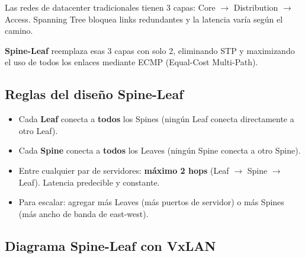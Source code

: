 \begin{concepto}
Las redes de datacenter tradicionales tienen 3 capas: Core $\to$ Distribution $\to$ Access.
Spanning Tree bloquea links redundantes y la latencia varía según el camino.

\textbf{Spine-Leaf} reemplaza esas 3 capas con solo 2, eliminando STP y maximizando
el uso de todos los enlaces mediante ECMP (Equal-Cost Multi-Path).
\end{concepto}

\subsection{Reglas del diseño Spine-Leaf}

\begin{itemize}
    \item Cada \textbf{Leaf} conecta a \textbf{todos} los Spines (ningún Leaf conecta
          directamente a otro Leaf).
    \item Cada \textbf{Spine} conecta a \textbf{todos} los Leaves (ningún Spine conecta
          a otro Spine).
    \item Entre cualquier par de servidores: \textbf{máximo 2 hops} (Leaf $\to$ Spine
          $\to$ Leaf). Latencia predecible y constante.
    \item Para escalar: agregar más Leaves (más puertos de servidor) o más Spines (más
          ancho de banda de east-west).
\end{itemize}

\subsection{Diagrama Spine-Leaf con VxLAN}

